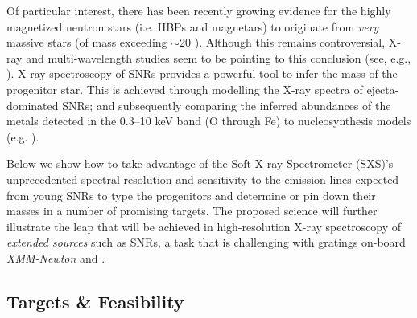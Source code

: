 \documentclass[11pt,a4paper]{article}
\begin{document}
Of particular interest, there has been recently growing evidence for
the highly magnetized neutron stars (i.e. HBPs and magnetars) to
originate from \textit{very} massive stars (of mass exceeding $\sim$20
\msun).  Although this remains controversial, X-ray and
multi-wavelength studies seem to be pointing to this conclusion (see,
e.g., \citealt{gaensler05, kumar2012, SSHKumar2013}).  X-ray
spectroscopy of SNRs provides a powerful tool to infer the mass of the
progenitor star. This is achieved through modelling the X-ray spectra
of ejecta-dominated SNRs; and subsequently comparing the
inferred abundances of the metals detected in the 0.3--10 keV band (O
through Fe) to nucleosynthesis models (e.g.
\citealt{WW95, Nomoto06}).

Below we show how to take advantage of the Soft X-ray Spectrometer
(SXS)'s unprecedented spectral resolution and sensitivity to the
emission lines expected from young SNRs to type the progenitors and
determine or pin down their masses in a number of promising targets.
The proposed science will further illustrate the leap that will be
achieved in high-resolution X-ray spectroscopy of \textit{extended sources}
such as SNRs, a task that is challenging with gratings on-board
\textit{XMM-Newton} and \chandra.

\subsection{Targets \& Feasibility}
\end{document}
